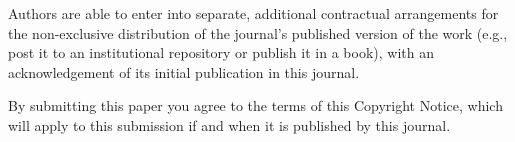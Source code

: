 Authors are able to enter into separate, additional contractual arrangements
for the non-exclusive distribution of the journal's published version of the
work (e.g., post it to an institutional repository or publish it in a book),
with an acknowledgement of its initial publication in this journal.

By submitting this paper you agree to the terms of this Copyright Notice, which
will apply to this submission if and when it is published by this journal.

